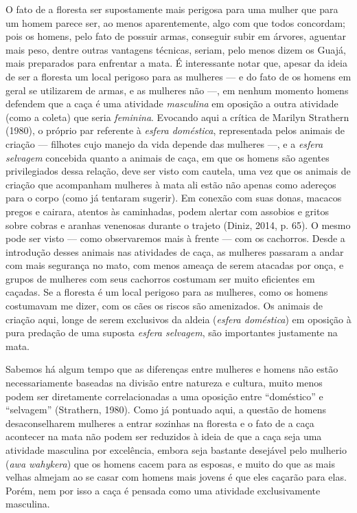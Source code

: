O fato de a floresta ser supostamente mais perigosa para uma mulher que
para um homem parece ser, ao menos aparentemente, algo com que todos
concordam; pois os homens, pelo fato de possuir armas, conseguir subir
em árvores, aguentar mais peso, dentre outras vantagens técnicas,
seriam, pelo menos dizem os Guajá, mais preparados para enfrentar a
mata. É interessante notar que, apesar da ideia de ser a floresta um
local perigoso para as mulheres --- e do fato de os homens em geral se
utilizarem de armas, e as mulheres não ---, em nenhum momento homens
defendem que a caça é uma atividade \emph{masculina} em oposição a outra
atividade (como a coleta) que seria \emph{feminina}. Evocando aqui a
crítica de Marilyn Strathern (1980), o próprio par referente à
\emph{esfera doméstica}, representada pelos animais de criação ---
filhotes cujo manejo da vida depende das mulheres ---, e a \emph{esfera
selvagem} concebida quanto a animais de caça, em que os homens são
agentes privilegiados dessa relação, deve ser visto com cautela, uma vez
que os animais de criação que acompanham mulheres à mata ali estão não
apenas como adereços para o corpo (como já tentaram sugerir). Em conexão
com suas donas, macacos pregos e cairara, atentos às caminhadas, podem
alertar com assobios e gritos sobre cobras e aranhas venenosas durante o
trajeto (Diniz, 2014, p. 65). O mesmo pode ser visto --- como observaremos
mais à frente --- com os cachorros. Desde a introdução desses animais nas
atividades de caça, as mulheres passaram a andar com mais segurança no
mato, com menos ameaça de serem atacadas por onça, e grupos de mulheres
com seus cachorros costumam ser muito eficientes em caçadas. Se a
floresta é um local perigoso para as mulheres, como os homens costumavam
me dizer, com os cães os riscos são amenizados. Os animais de criação
aqui, longe de serem exclusivos da aldeia (\emph{esfera doméstica}) em
oposição à pura predação de uma suposta \emph{esfera selvagem}, são
importantes justamente na mata.

Sabemos há algum tempo que as diferenças entre mulheres e homens não
estão necessariamente baseadas na divisão entre natureza e cultura,
muito menos podem ser diretamente correlacionadas a uma oposição entre
``doméstico'' e ``selvagem'' (Strathern, 1980). Como já pontuado aqui, a
questão de homens desaconselharem mulheres a entrar sozinhas na floresta
e o fato de a caça acontecer na mata não podem ser reduzidos à ideia de
que a caça seja uma atividade masculina por excelência, embora seja
bastante desejável pelo mulherio (\emph{awa wahykera}) que os homens
cacem para as esposas, e muito do que as mais velhas almejam ao se casar
com homens mais jovens é que eles caçarão para elas. Porém, nem por isso
a caça é pensada como uma atividade exclusivamente masculina.

